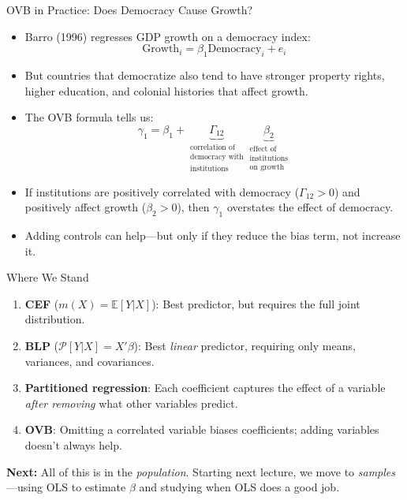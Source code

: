 \documentclass[aspectratio=169, handout, t]{beamer}
\numberwithin{equation}{section}
\begin{document}
\begin{frame}{OVB in Practice: Does Democracy Cause Growth?}
\begin{itemize}
\item Barro (1996) regresses GDP growth on a democracy index:
$$\text{Growth}_i = \beta_1 \text{Democracy}_i + e_i$$
\item But countries that democratize also tend to have stronger property rights, higher education, and colonial histories that affect growth.\pause
\item The OVB formula tells us:
$$\gamma_1 = \beta_1 + \underbrace{\Gamma_{12}}_{\substack{\text{correlation of}\\\text{democracy with}\\\text{institutions}}}\underbrace{\beta_2}_{\substack{\text{effect of}\\\text{institutions}\\\text{on growth}}}$$\pause
\item If institutions are positively correlated with democracy ($\Gamma_{12}>0$) and positively affect growth ($\beta_2>0$), then $\gamma_1$ \alert{overstates} the effect of democracy.
\item Adding controls can help---but only if they reduce the bias term, not increase it.
\end{itemize}
\end{frame}


\begin{frame}{Where We Stand}
\small
\begin{tcolorbox}[colback=blue!5, colframe=blue!50, title=Recap: From Population to Practice]
\begin{enumerate}
\item \textbf{CEF} ($m(X)=\mathbb{E}[Y|X]$): Best predictor, but requires the full joint distribution.
\item \textbf{BLP} ($\mathcal{P}[Y|X]=X'\beta$): Best \emph{linear} predictor, requiring only means, variances, and covariances.
\item \textbf{Partitioned regression}: Each coefficient captures the effect of a variable \emph{after removing} what other variables predict.
\item \textbf{OVB}: Omitting a correlated variable biases coefficients; adding variables doesn't always help.
\end{enumerate}
\end{tcolorbox}
\medskip
\textbf{Next:} All of this is in the \emph{population}. Starting next lecture, we move to \emph{samples}---using OLS to estimate $\beta$ and studying when OLS does a good job.
\end{frame}
\end{document}

